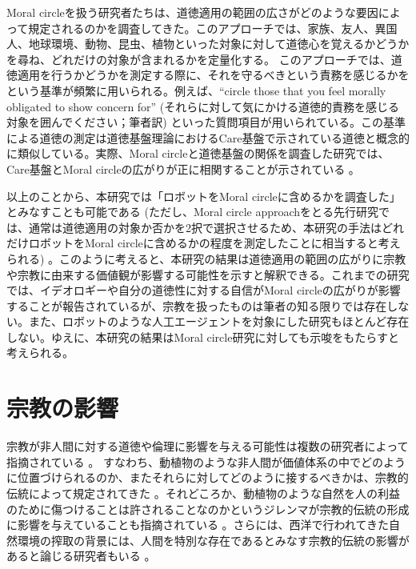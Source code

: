 \documentclass[a4j,12pt]{jreport}
\begin{document}
Moral circleを扱う研究者たちは、道徳適用の範囲の広さがどのような要因によって規定されるのかを調査してきた。このアプローチでは、家族、友人、異国人、地球環境、動物、昆虫、植物といった対象に対して道徳心を覚えるかどうかを尋ね、どれだけの対象が含まれるかを定量化する。
このアプローチでは、道徳適用を行うかどうかを測定する際に、それを守るべきという責務を感じるかをという基準が頻繁に用いられる。例えば、``circle those that you feel morally obligated to show concern for'' (それらに対して気にかける道徳的責務を感じる対象を囲んでください；筆者訳) \cite{laham}といった質問項目が用いられている。この基準による道徳の測定は道徳基盤理論におけるCare基盤で示されている道徳と概念的に類似している。実際、Moral circleと道徳基盤の関係を調査した研究では、Care基盤とMoral circleの広がりが正に相関することが示されている\cite{crim} 。


以上のことから、本研究では「ロボットをMoral circleに含めるかを調査した」とみなすことも可能である (ただし、Moral circle approachをとる先行研究では、通常は道徳適用の対象か否かを2択で選択させるため、本研究の手法はどれだけロボットをMoral circleに含めるかの程度を測定したことに相当すると考えられる) 。このように考えると、本研究の結果は道徳適用の範囲の広がりに宗教や宗教に由来する価値観が影響する可能性を示すと解釈できる。これまでの研究では、イデオロギー\cite{ideo}や自分の道徳性に対する自信\cite{jishin}がMoral circleの広がりが影響することが報告されているが、宗教を扱ったものは筆者の知る限りでは存在しない。また、ロボットのような人工エージェントを対象にした研究もほとんど存在しない。ゆえに、本研究の結果はMoral circle研究に対しても示唆をもたらすと考えられる。

\section{宗教の影響}
宗教が非人間に対する道徳や倫理に影響を与える可能性は複数の研究者によって指摘されている\cite{ecocen, white_, jaga, ser} 。%
すなわち、動植物のような非人間が価値体系の中でどのように位置づけられるのか、またそれらに対してどのように接するべきかは、宗教的伝統によって規定されてきた\cite{jaga} 。それどころか、動植物のような自然を人の利益のために傷つけることは許されることなのかというジレンマが宗教的伝統の形成に影響を与えていることも指摘されている\cite{ser} 。さらには、西洋で行われてきた自然環境の搾取の背景には、人間を特別な存在であるとみなす宗教的伝統の影響があると論じる研究者もいる\cite{white_} 。
\end{document}
